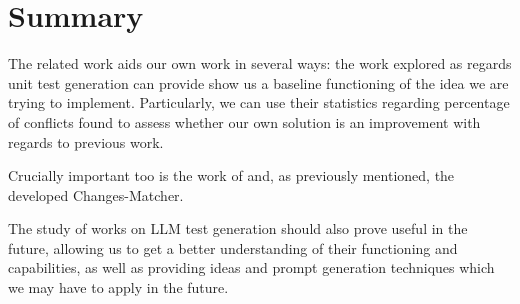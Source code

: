 \section{Summary}

The related work aids our own work in several ways: the work explored as regards unit test generation can provide show us a baseline functioning of the idea we are trying to implement. Particularly, we can use their statistics regarding percentage of conflicts found to assess whether our own solution is an improvement with regards to previous work.

Crucially important too is the work of \citet{kn:nuno} and, as previously mentioned, the developed Changes-Matcher.

The study of works on LLM test generation should also prove useful in the future, allowing us to get a better understanding of their functioning and capabilities, as well as providing ideas and prompt generation techniques which we may have to apply in the future.
